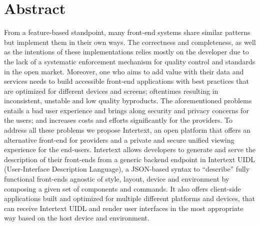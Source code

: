 \section*{Abstract}

From a feature-based standpoint, many front-end systems share similar patterns but implement them in their own ways. The correctness and completeness, as well as the intentions of these implementations relies mostly on the developer due to the lack of a systematic enforcement mechanism for quality control and standards in the open market. Moreover, one who aims to add value with their data and services needs to build accessible front-end applications with best practices that are optimized for different devices and screens; oftentimes resulting in inconsistent, unstable and low quality byproducts. The aforementioned problems entails a bad user experience and brings along security and privacy concerns for the users; and increases costs and efforts significantly for the providers. To address all these problems we propose Intertext, an open platform that offers an alternative front-end for providers and a private and secure unified viewing experience for the end-users. Intertext allows developers to generate and serve the description of their front-ends from a generic backend endpoint in Intertext UIDL (User-Interface Description Language), a JSON-based syntax to “describe” fully functional front-ends agnostic of style, layout, device and environment by composing a given set of components and commands. It also offers client-side applications built and optimized for multiple different platforms and devices, that can receive Intertext UIDL and render user interfaces in the most appropriate way based on the host device and environment.
